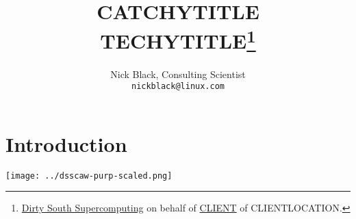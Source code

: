\documentclass[letterpaper,10pt]{article}
\title{CATCHYTITLE\\
TECHYTITLE\thanks{
 \href{https://www.dsscaw.com/}{Dirty South Supercomputing} on behalf
 of \href{WEBSITE}{CLIENT} of CLIENTLOCATION.
}\\
}
\author{Nick Black, Consulting Scientist\\
\texttt{nickblack@linux.com}
}
\begin{document}
\maketitle
\thispagestyle{fancy}
\date{}
\begin{abstract}
\end{abstract}
\section{Introduction}
\printbibliography
\vfill
\begin{minipage}{\textwidth}
\begin{center}
\texttt{[image: ../dsscaw-purp-scaled.png]}
\end{center}
\end{minipage}
\end{document}
